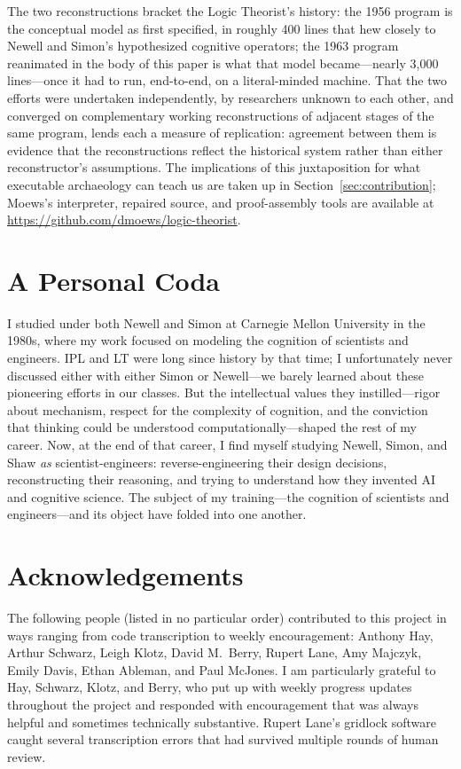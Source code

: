 \documentclass[journal]{IEEEtran}
\begin{document}
The two reconstructions bracket the Logic Theorist's history: the 1956
program is the conceptual model as first specified, in roughly 400
lines that hew closely to Newell and Simon's hypothesized cognitive
operators; the 1963 program reanimated in the body of this paper is
what that model became---nearly 3,000 lines---once it had to run,
end-to-end, on a literal-minded machine. That the two efforts were
undertaken independently, by researchers unknown to each other, and
converged on complementary working reconstructions of adjacent stages
of the same program, lends each a measure of replication: agreement
between them is evidence that the reconstructions reflect the
historical system rather than either reconstructor's assumptions. The
implications of this juxtaposition for what executable archaeology can
teach us are taken up in Section~\ref{sec:contribution}; Moews's
interpreter, repaired source, and proof-assembly tools are available
at \url{https://github.com/dmoews/logic-theorist}.

\section*{A Personal Coda}

I studied under both Newell and Simon at Carnegie Mellon University in
the 1980s, where my work focused on modeling the cognition of
scientists and engineers. IPL and LT were long since history by that
time; I unfortunately never discussed either with either Simon or
Newell---we barely learned about these pioneering efforts in our
classes. But the intellectual values they instilled---rigor about
mechanism, respect for the complexity of cognition, and the conviction
that thinking could be understood computationally---shaped the rest of
my career. Now, at the end of that career, I find myself studying
Newell, Simon, and Shaw \textit{as} scientist-engineers:
reverse-engineering their design decisions, reconstructing their
reasoning, and trying to understand how they invented AI and cognitive
science. The subject of my training---the cognition of scientists and
engineers---and its object have folded into one another.

\section*{Acknowledgements}

The following people (listed in no particular order) contributed to
this project in ways ranging from code transcription to weekly
encouragement: Anthony Hay, Arthur Schwarz, Leigh Klotz, David
M.\ Berry, Rupert Lane, Amy Majczyk, Emily Davis, Ethan Ableman, and
Paul McJones. I am particularly grateful to Hay, Schwarz, Klotz, and
Berry, who put up with weekly progress updates throughout the project
and responded with encouragement that was always helpful and sometimes
technically substantive. Rupert Lane's gridlock software caught
several transcription errors that had survived multiple rounds of
human review.
\end{document}
